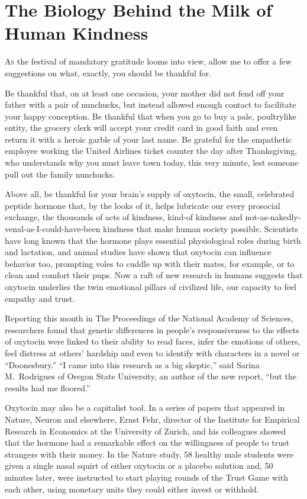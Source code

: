 ﻿\documentclass[12pt]{article}
\begin{document}
\section{The Biology Behind the Milk of Human Kindness}

\lettrine{A}{s} the festival of mandatory gratitude looms into view, allow
me to offer a few suggestions on what, exactly, you should be thankful for.

Be thankful that, on at least one occasion, your mother did not fend off your father with a pair of
nunchucks, but instead allowed enough contact to facilitate your happy conception. Be thankful that
when you go to buy a pale, poultrylike entity, the grocery clerk will accept your credit card in
good faith and even return it with a heroic garble of your last name. Be grateful for the empathetic
employee working the United Airlines ticket counter the day after Thanksgiving, who understands why
you must leave town today, this very minute, lest someone pull out the family nunchucks.

Above all, be thankful for your brain's supply of oxytocin, the small, celebrated peptide hormone
that, by the looks of it, helps lubricate our every prosocial exchange, the thousands of acts of
kindness, kind-of kindness and not-as-nakedly-venal-as-I-could-have-been kindness that make human
society possible. Scientists have long known that the hormone plays essential physiological roles
during birth and lactation, and animal studies have shown that oxytocin can influence behavior too,
prompting voles to cuddle up with their mates, for example, or to clean and comfort their pups. Now
a raft of new research in humans suggests that oxytocin underlies the twin emotional pillars of
civilized life, our capacity to feel empathy and trust.

Reporting this month in The Proceedings of the National Academy of Sciences, researchers found that
genetic differences in people's responsiveness to the effects of oxytocin were linked to their
ability to read faces, infer the emotions of others, feel distress at others' hardship and even to
identify with characters in a novel or ``Doonesbury.'' ``I came into this research as a big
skeptic,'' said Sarina M.~Rodrigues of Oregon State University, an author of the new report, ``but
the results had me floored.''

Oxytocin may also be a capitalist tool. In a series of papers that appeared in Nature, Neuron and
elsewhere, Ernst Fehr, director of the Institute for Empirical Research in Economics at the
University of Zurich, and his colleagues showed that the hormone had a remarkable effect on the
willingness of people to trust strangers with their money. In the Nature study, 58 healthy male
students were given a single nasal squirt of either oxytocin or a placebo solution and, 50 minutes
later, were instructed to start playing rounds of the Trust Game with each other, using monetary
units they could either invest or withhold.
\end{document}
